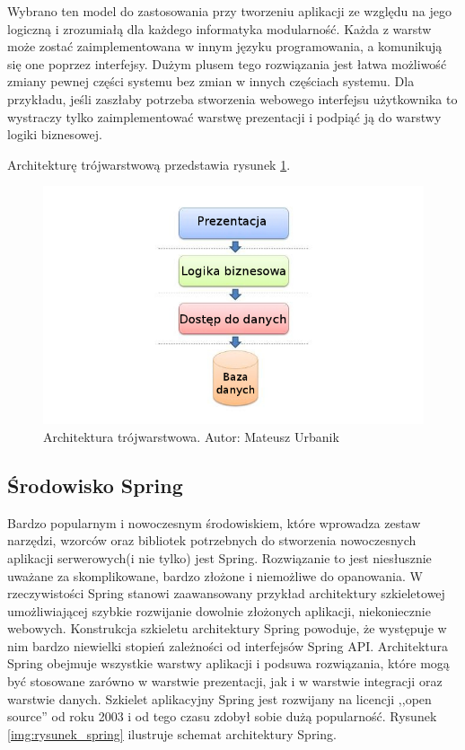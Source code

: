 Wybrano ten model do zastosowania przy tworzeniu aplikacji ze względu na jego logiczną i zrozumiałą dla każdego informatyka modularność. Każda z warstw może zostać zaimplementowana w innym języku programowania, a komunikują się one poprzez interfejsy. Dużym plusem tego rozwiązania jest łatwa możliwość zmiany pewnej części systemu bez zmian w innych częściach systemu. Dla przykładu, jeśli zaszłaby potrzeba stworzenia webowego interfejsu użytkownika to wystraczy tylko zaimplementować warstwę prezentacji i podpiąć ją do warstwy logiki biznesowej.

Architekturę trójwarstwową przedstawia rysunek \ref{img:rysunek_3layer}.
\begin{figure}[!ht]
\label{img:rysunek_3layer}	
\includegraphics[scale=0.5]{images/3layer-architect}
\caption[Rysunek przedstawiający model architektury trójwarstwowej]{Architektura trójwarstwowa. Autor: Mateusz Urbanik}
\end{figure}

\subsection{Środowisko Spring}
\label{sec:modelArchitekturySpring}
Bardzo popularnym i nowoczesnym środowiskiem, które wprowadza zestaw narzędzi, wzorców oraz bibliotek potrzebnych do stworzenia nowoczesnych aplikacji serwerowych(i nie tylko) jest Spring. Rozwiązanie to jest niesłusznie uważane za skomplikowane, bardzo złożone i niemożliwe do opanowania. W rzeczywistości Spring stanowi zaawansowany przykład architektury szkieletowej umożliwiającej szybkie rozwijanie dowolnie złożonych aplikacji, niekoniecznie webowych. Konstrukcja szkieletu architektury Spring powoduje, że występuje w nim bardzo niewielki stopień zależności od interfejsów Spring API. Architektura Spring obejmuje wszystkie warstwy aplikacji i podsuwa rozwiązania, które mogą być stosowane zarówno w warstwie prezentacji, jak i w warstwie integracji oraz warstwie danych. Szkielet aplikacyjny Spring jest rozwijany na licencji ,,open source'' od roku 2003 i od tego czasu zdobył sobie dużą popularność\cite{bruce_spring}. Rysunek \ref{img:rysunek_spring} ilustruje schemat architektury Spring.

